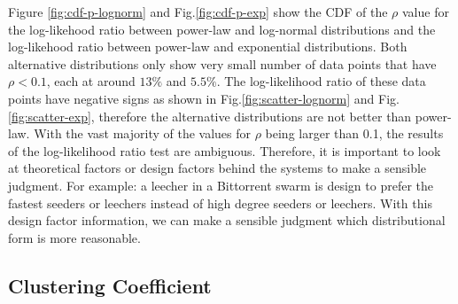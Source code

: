 Figure \ref{fig:cdf-p-lognorm} and Fig.\ref{fig:cdf-p-exp} show the CDF of the $\rho$ value for the log-likehood ratio between power-law and log-normal distributions and the log-likehood ratio between power-law and exponential distributions.
Both alternative distributions only show very small number of data points that have $\rho < 0.1$, each at around $13\%$ and $5.5\%$.
The log-likelihood ratio of these data points have negative signs as shown in Fig.\ref{fig:scatter-lognorm} and Fig.\ref{fig:scatter-exp}, therefore the alternative distributions are not better than power-law.
With the vast majority of the values for $\rho$ being larger than 0.1, the results of the log-likelihood ratio test are ambiguous. 
Therefore, it is important to look at theoretical factors or design factors behind the systems to make a sensible judgment.
For example: a leecher in a Bittorrent swarm is design to prefer the fastest seeders or leechers instead of high degree seeders or leechers. 
With this design factor information, we can make a sensible judgment which distributional form is more reasonable.


\subsection{Clustering Coefficient}\label{clusteringcoef}

